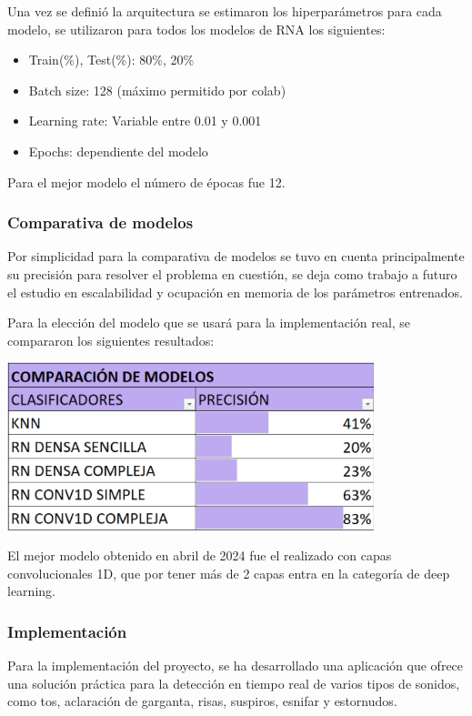 Una vez se definió la arquitectura se estimaron los hiperparámetros para cada modelo, se utilizaron para todos los modelos de RNA los siguientes:
\begin{itemize}
    \item Train(\%), Test(\%): 80\%, 20\%
    \item Batch size: 128 (máximo permitido por colab)
    \item Learning rate: Variable entre 0.01 y 0.001
    \item Epochs: dependiente del modelo
\end{itemize}
Para el mejor modelo el número de épocas fue 12.
\subsubsection{Comparativa de modelos}
Por simplicidad para la comparativa de modelos se tuvo en cuenta principalmente su precisión para resolver el problema en cuestión, se deja como trabajo a futuro el estudio en escalabilidad y ocupación en memoria de los parámetros entrenados.

Para la elección del modelo que se usará para la implementación real, se compararon los siguientes resultados:
\begin{center}
    \includegraphics[width=0.8\textwidth]{ImagenesLatex/ComparacionModelos.PNG}
\end{center}

El mejor modelo obtenido en abril de 2024 fue el realizado con capas convolucionales 1D, que por tener más de 2 capas entra en la categoría de deep learning.

\subsubsection{Implementación}
Para la implementación del proyecto, se ha desarrollado una aplicación que ofrece una solución práctica para la detección en tiempo real de varios tipos de sonidos, como tos, aclaración de garganta, risas, suspiros, esnifar y estornudos.

